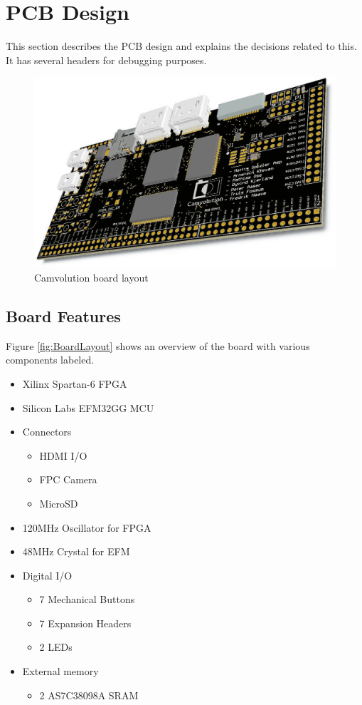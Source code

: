 \section{PCB Design}
This section describes the PCB design and explains the decisions related to this.
It has several headers for debugging purposes.

\begin{figure}[h]
    \includegraphics[width=\linewidth]{img/OverviewCamvolutionKit}
    \caption{Camvolution board layout}
\end{figure}

\subsection{Board Features}
Figure \ref{fig:BoardLayout} shows an overview of the board with various components labeled.

\begin{itemize}
    \item Xilinx Spartan-6 FPGA
    \item Silicon Labs EFM32GG MCU
    \item Connectors
        \begin{itemize}
            \item HDMI I/O
            \item FPC Camera
            \item MicroSD
        \end{itemize}
    \item 120MHz Oscillator for FPGA
    \item 48MHz Crystal for EFM
    \item Digital I/O
        \begin{itemize}
            \item 7 Mechanical Buttons
            \item 7 Expansion Headers
            \item 2 LEDs
        \end{itemize}
    \item External memory
        \begin{itemize}
            \item 2 AS7C38098A SRAM
        \end{itemize}
\end{itemize}

